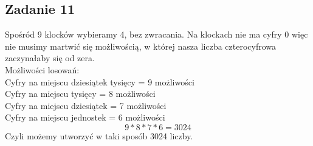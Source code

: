\subsection{Zadanie 11}

Spośród 9 klocków wybieramy 4, bez zwracania. Na klockach nie ma cyfry 0
więc nie musimy martwić się możliwością, w której nasza liczba czterocyfrowa
zaczynałaby się od zera.\\

Możliwości losowań:\\
Cyfry na miejscu dziesiątek tysięcy = 9 możliwości\\
Cyfry na miejscu tysięcy = 8 możliwości\\
Cyfry na miejscu dziesiątek = 7 możliwości\\
Cyfry na miejscu jednostek = 6 możliwości
$$
9*8*7*6 = 3024
$$
Czyli możemy utworzyć w taki sposób 3024 liczby.

